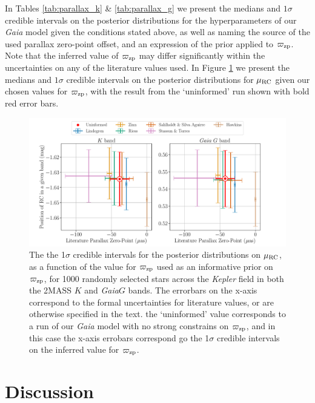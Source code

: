 \documentclass[fleqn,usenatbib]{mnras}
\newcommand{\oozp}{\mbox{$\varpi_{\rm zp}$}\xspace}
\newcommand{\murc}{\mbox{$\mu_{\rm RC}$}\xspace}
\newcommand{\gaia}{\emph{Gaia}\xspace}
\newcommand{\nnew}[1]{#1}
\begin{document}
In Tables \ref{tab:parallax_k} \& \ref{tab:parallax_g} we present the medians and $1\sigma$ credible intervals on the posterior distributions for the hyperparameters of our \gaia model given the conditions stated above, as well as naming the source of the used parallax zero-point offset, and an expression of the prior applied to \oozp. Note that \nnew{the} inferred value of \oozp may differ significantly within the uncertainties on any of the literature values used. In Figure \ref{fig:parallax_values} we present the medians and \nnew{$1\sigma$ credible intervals} on the posterior distributions for \murc given our chosen values for \oozp, with the result from the `uninformed' run shown with bold red error bars.

\begin{figure}
    \centering
    \includegraphics[width=\textwidth]{parallax-results.pdf}
    \caption{The \nnew{the 1$\sigma$ credible intervals} for the posterior distributions on \murc, as a function of the value for \oozp used as an informative prior on \oozp, for 1000 randomly selected stars across the \textit{Kepler} field in both the 2MASS $K$ and \gaia $G$ bands. The errorbars on the x-axis correspond to the formal uncertainties for literature values, or are otherwise specified in the text. the `uninformed' value corresponds to a run of our \gaia model with no strong constrains on \oozp, and in this case the x-axis errobars correspond go \nnew{the 1$\sigma$ credible intervals} on the inferred value for \oozp.}
    \label{fig:parallax_values}    
\end{figure}

\section{Discussion}\label{sec:discussion}
\end{document}
